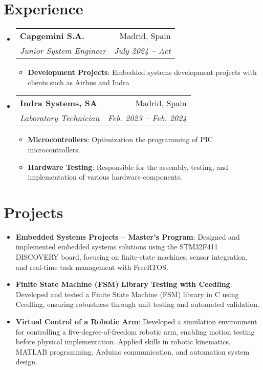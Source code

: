 \documentclass[letterpaper,11pt]{article}
\makeatletter
\newcommand{\resumeItem}[2]{
  \item\small{
    \textbf{#1}{: #2 \vspace{-2pt}}
  }
}
\newcommand{\resumeSubheading}[4]{
  \vspace{-1pt}\item
    \begin{tabular*}{0.97\textwidth}{l@{\extracolsep{\fill}}r}
      \textbf{#1} & #2 \\
      \textit{\small#3} & \textit{\small #4} \\
    \end{tabular*}\vspace{-5pt}
}
\newcommand{\resumeSubItem}[2]{\resumeItem{#1}{#2}\vspace{-4pt}}
\newcommand{\resumeSubHeadingListStart}{\begin{itemize}[leftmargin=*]}
\newcommand{\resumeSubHeadingListEnd}{\end{itemize}}
\newcommand{\resumeItemListStart}{\begin{itemize}}
\newcommand{\resumeItemListEnd}{\end{itemize}\vspace{-5pt}}
\makeatother
\begin{document}
\smallskip
\section{Experience}
    \smallskip
    \resumeSubHeadingListStart

        \resumeSubheading
            { Capgemini S.A. }{ Madrid, Spain }
            {Junior System Engineer}{ July 2024 -- Act }
        \resumeItemListStart
            \resumeItem{Development Projects}
            {Embedded systems development projects with clients such as Airbus and Indra}
        \resumeItemListEnd

        \smallskip
        
        \resumeSubheading
            { Indra Systems, SA }{Madrid, Spain}
            {Laboratory Technician}{Feb. 2023 -- Feb. 2024}
        \resumeItemListStart
            \resumeItem{Microcontrollers}
            {Optimization the programming of PIC microcontrollers.}
            \resumeItem{Hardware Testing}
            {Responsible for the assembly, testing, and implementation of various hardware components.}
        \resumeItemListEnd   

    \resumeSubHeadingListEnd

\smallskip
\section{Projects}
  \resumeSubHeadingListStart
    \resumeSubItem{Embedded Systems Projects – Master’s Program}
      {Designed and implemented embedded systems solutions using the STM32F411 DISCOVERY board, focusing on finite-state machines, sensor integration, and real-time task management with FreeRTOS.}
    \resumeSubItem{Finite State Machine (FSM) Library Testing with Ceedling}
      {Developed and tested a Finite State Machine (FSM) library in C using Ceedling, ensuring robustness through unit testing and automated validation.}
    \resumeSubItem{Virtual Control of a Robotic Arm}
      {Developed a simulation environment for controlling a five-degree-of-freedom robotic arm, enabling motion testing before physical implementation. Applied skills in robotic kinematics, MATLAB programming, Arduino communication, and automation system design.}
  \resumeSubHeadingListEnd

\smallskip
\end{document}
